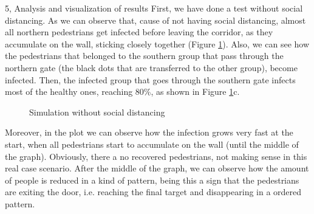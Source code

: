 \begin{task}{5, Analysis and visualization of results}
First, we have done a test without social distancing. As we can observe that, cause of not having social distancing, almost all northern pedestrians get infected before leaving the corridor, as they accumulate on the wall, sticking closely together (Figure \ref{tumnodist}). Also, we can see how the pedestrians that belonged to the southern group that pass through the northern gate (the black dots that are transferred to the other group), become infected. Then, the infected group that goes through the southern gate infects most of the healthy ones, reaching 80\%, as shown in Figure \ref{tumnodist}c.
\begin{figure}[H]
\centering
{}
\caption{Simulation without social distancing}
\label{tumnodist}
\end{figure}
Moreover, in the plot we can observe how the infection grows very fast at the start, when all pedestrians start to accumulate on the wall (until the middle of the graph). Obviously, there a no recovered pedestrians, not making sense in this real case scenario. After the middle of the graph, we can observe how the amount of people is reduced in a kind of pattern, being this a sign that the pedestrians are exiting the door, i.e. reaching the final target and disappearing in a ordered pattern.


\end{task}
